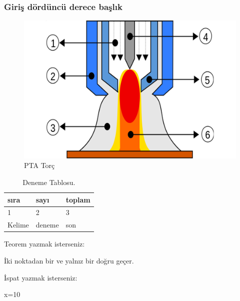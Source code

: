 \subsubsection{Giriş dördüncü derece başlık}
\lipsum[1-2]
\begin{figure}[h]
\centering
\includegraphics[width=\textwidth]{gorseller/ptaTorc}
\caption{PTA Torç}\label{fig:PtaTorc1}
\end{figure}
\lipsum[1-2]
\begin{table}
\centering
\caption{Deneme Tablosu.}\label{tab:den1}
\begin{tabular}{|l|l|l|}
\hline
sıra   & sayı   & toplam \\ \hline
1      & 2      & 3      \\ \hline
Kelime & deneme & son    \\ \hline
\end{tabular}
\end{table}

Teorem yazmak isterseniz:
\begin{theorem}[Öklid]
 İki noktadan bir ve yalnız bir doğru geçer.
\end{theorem}

İspat yazmak isterseniz:
\begin{ispat}
x=10
\end{ispat}